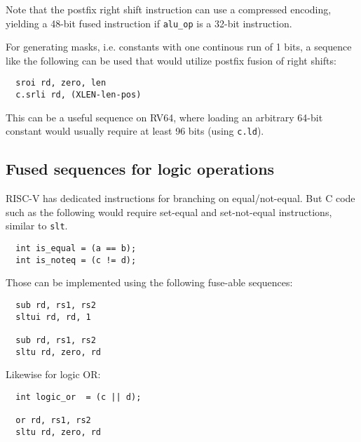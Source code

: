 Note that the postfix right shift instruction can use a compressed encoding,
yielding a 48-bit fused instruction if {\tt alu\_op} is a 32-bit instruction.

For generating masks, i.e. constants with one continous run of 1 bits, a sequence
like the following can be used that would utilize postfix fusion of right shifts:

\begin{minipage}{\linewidth}
\begin{verbatim}
  sroi rd, zero, len
  c.srli rd, (XLEN-len-pos)
\end{verbatim}
\end{minipage}

This can be a useful sequence on RV64, where loading an arbitrary 64-bit constant would usually
require at least 96 bits (using \texttt{c.ld}).


\subsection{Fused sequences for logic operations}

RISC-V has dedicated instructions for branching on equal/not-equal. But C code
such as the following would require set-equal and set-not-equal instructions, similar
to {\tt slt}.

\begin{minipage}{\linewidth}
\begin{verbatim}
  int is_equal = (a == b);
  int is_noteq = (c != d);
\end{verbatim}
\end{minipage}

Those can be implemented using the following fuse-able sequences:

\begin{minipage}{\linewidth}
\begin{verbatim}
  sub rd, rs1, rs2
  sltui rd, rd, 1

  sub rd, rs1, rs2
  sltu rd, zero, rd
\end{verbatim}
\end{minipage}

Likewise for logic OR:

\begin{minipage}{\linewidth}
\begin{verbatim}
  int logic_or  = (c || d);

  or rd, rs1, rs2
  sltu rd, zero, rd
\end{verbatim}
\end{minipage}

